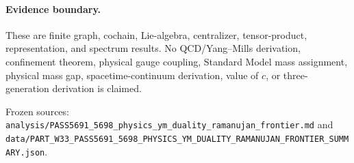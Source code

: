 \paragraph{Evidence boundary.}
These are finite graph, cochain, Lie-algebra, centralizer, tensor-product, representation, and spectrum results. No QCD/Yang--Mills derivation, confinement theorem, physical gauge coupling, Standard Model mass assignment, physical mass gap, spacetime-continuum derivation, value of $c$, or three-generation derivation is claimed.

Frozen sources: \texttt{analysis/PASS5691\_5698\_physics\_ym\_duality\_ramanujan\_frontier.md} and \texttt{data/PART\_W33\_PASS5691\_5698\_PHYSICS\_YM\_DUALITY\_RAMANUJAN\_FRONTIER\_SUMMARY.json}.
